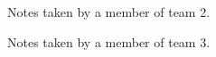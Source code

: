 \documentclass[sigplan,10pt]{acmart}
\begin{document}
\begin{figure}
    \caption{Notes taken by a member of team 2.}
    \label{fig:notes2}
\end{figure}

\begin{figure}
    \caption{Notes taken by a member of team 3.}
    \label{fig:notes3}
\end{figure}
\end{document}
